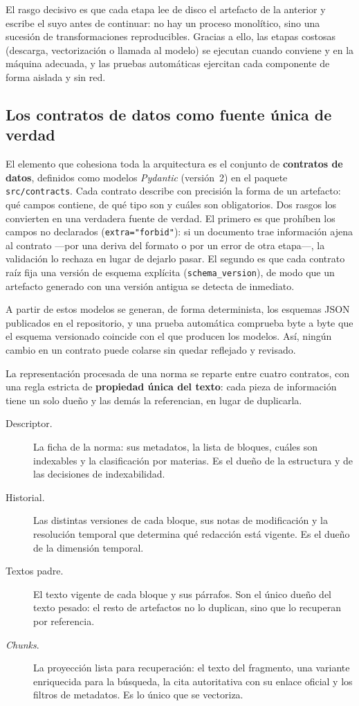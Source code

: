 El rasgo decisivo es que cada etapa lee de disco el artefacto de la anterior y escribe el suyo antes de continuar: no hay un proceso monolítico, sino una sucesión de transformaciones reproducibles. Gracias a ello, las etapas costosas (descarga, vectorización o llamada al modelo) se ejecutan cuando conviene y en la máquina adecuada, y las pruebas automáticas ejercitan cada componente de forma aislada y sin red.

\subsection{Los contratos de datos como fuente única de verdad}
\label{subsec:contratos}

El elemento que cohesiona toda la arquitectura es el conjunto de \textbf{contratos de datos}, definidos como modelos \emph{Pydantic} (versión~2) en el paquete \texttt{src/contracts}. Cada contrato describe con precisión la forma de un artefacto: qué campos contiene, de qué tipo son y cuáles son obligatorios. Dos rasgos los convierten en una verdadera fuente de verdad. El primero es que prohíben los campos no declarados (\texttt{extra="forbid"}): si un documento trae información ajena al contrato —por una deriva del formato o por un error de otra etapa—, la validación lo rechaza en lugar de dejarlo pasar. El segundo es que cada contrato raíz fija una versión de esquema explícita (\texttt{schema\_version}), de modo que un artefacto generado con una versión antigua se detecta de inmediato.

A partir de estos modelos se generan, de forma determinista, los esquemas JSON publicados en el repositorio, y una prueba automática comprueba byte a byte que el esquema versionado coincide con el que producen los modelos. Así, ningún cambio en un contrato puede colarse sin quedar reflejado y revisado.

La representación procesada de una norma se reparte entre cuatro contratos, con una regla estricta de \textbf{propiedad única del texto}: cada pieza de información tiene un solo dueño y las demás la referencian, en lugar de duplicarla.

\begin{description}
  \item[Descriptor.] La ficha de la norma: sus metadatos, la lista de bloques, cuáles son indexables y la clasificación por materias. Es el dueño de la estructura y de las decisiones de indexabilidad.
  \item[Historial.] Las distintas versiones de cada bloque, sus notas de modificación y la resolución temporal que determina qué redacción está vigente. Es el dueño de la dimensión temporal.
  \item[Textos padre.] El texto vigente de cada bloque y sus párrafos. Son el único dueño del texto pesado: el resto de artefactos no lo duplican, sino que lo recuperan por referencia.
  \item[\emph{Chunks}.] La proyección lista para recuperación: el texto del fragmento, una variante enriquecida para la búsqueda, la cita autoritativa con su enlace oficial y los filtros de metadatos. Es lo único que se vectoriza.
\end{description}

